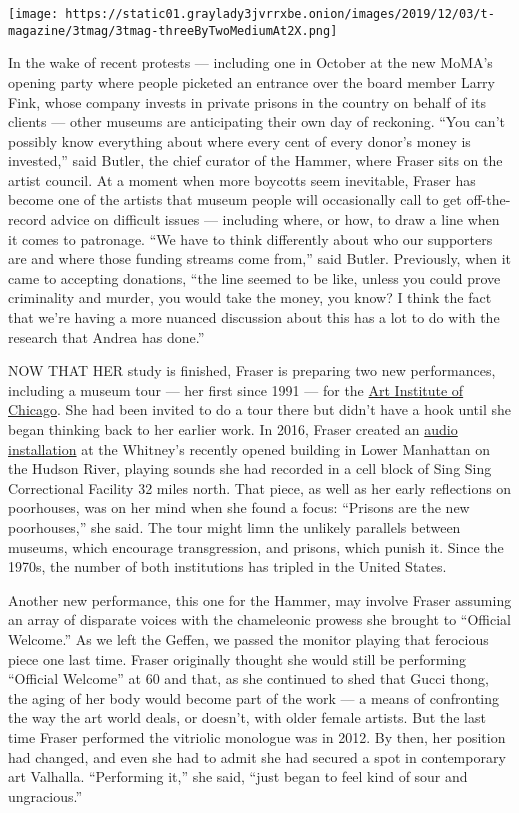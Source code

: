 \texttt{[image: https://static01.graylady3jvrrxbe.onion/images/2019/12/03/t-magazine/3tmag/3tmag-threeByTwoMediumAt2X.png]}

In the wake of recent protests --- including one in October at the new
MoMA's opening party where people picketed an entrance over the board
member Larry Fink, whose company invests in private prisons in the
country on behalf of its clients --- other museums are anticipating
their own day of reckoning. ``You can't possibly know everything about
where every cent of every donor's money is invested,'' said Butler, the
chief curator of the Hammer, where Fraser sits on the artist council. At
a moment when more boycotts seem inevitable, Fraser has become one of
the artists that museum people will occasionally call to get
off-the-record advice on difficult issues --- including where, or how,
to draw a line when it comes to patronage. ``We have to think
differently about who our supporters are and where those funding streams
come from,'' said Butler. Previously, when it came to accepting
donations, ``the line seemed to be like, unless you could prove
criminality and murder, you would take the money, you know? I think the
fact that we're having a more nuanced discussion about this has a lot to
do with the research that Andrea has done.''

NOW THAT HER study is finished, Fraser is preparing two new
performances, including a museum tour --- her first since 1991 --- for
the \href{https://www.artic.edu/}{Art Institute of Chicago}. She had
been invited to do a tour there but didn't have a hook until she began
thinking back to her earlier work. In 2016, Fraser created an
\href{https://www.nytimes3xbfgragh.onion/2016/02/28/arts/design/the-whitney-will-be-alive-with-the-sounds-of-sing-sing.html}{audio
installation} at the Whitney's recently opened building in Lower
Manhattan on the Hudson River, playing sounds she had recorded in a cell
block of Sing Sing Correctional Facility 32 miles north. That piece, as
well as her early reflections on poorhouses, was on her mind when she
found a focus: ``Prisons are the new poorhouses,'' she said. The tour
might limn the unlikely parallels between museums, which encourage
transgression, and prisons, which punish it. Since the 1970s, the number
of both institutions has tripled in the United States.

Another new performance, this one for the Hammer, may involve Fraser
assuming an array of disparate voices with the chameleonic prowess she
brought to ``Official Welcome.'' As we left the Geffen, we passed the
monitor playing that ferocious piece one last time. Fraser originally
thought she would still be performing ``Official Welcome'' at 60 and
that, as she continued to shed that Gucci thong, the aging of her body
would become part of the work --- a means of confronting the way the art
world deals, or doesn't, with older female artists. But the last time
Fraser performed the vitriolic monologue was in 2012. By then, her
position had changed, and even she had to admit she had secured a spot
in contemporary art Valhalla. ``Performing it,'' she said, ``just began
to feel kind of sour and ungracious.''

